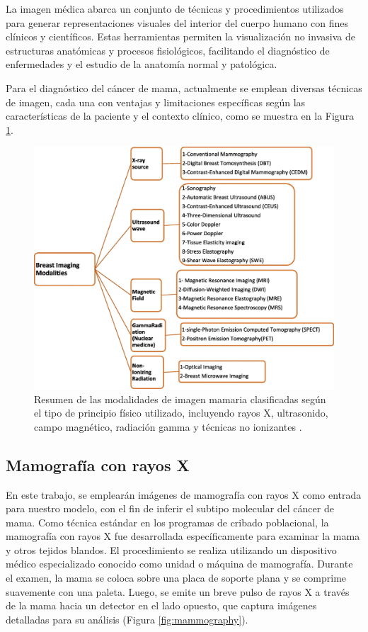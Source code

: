 \documentclass[a4paper,10pt]{book}
\begin{document}
La imagen médica abarca un conjunto de técnicas y procedimientos utilizados para generar representaciones visuales del interior del cuerpo humano con fines clínicos y científicos. Estas herramientas permiten la visualización no invasiva de estructuras anatómicas y procesos fisiológicos, facilitando el diagnóstico de enfermedades y el estudio de la anatomía normal y patológica.

Para el diagnóstico del cáncer de mama, actualmente se emplean diversas técnicas de imagen, cada una con ventajas y limitaciones específicas según las características de la paciente y el contexto clínico, como se muestra en la Figura \ref{fig:breast_cancer_medical}.

\begin{figure}[h!]
    \centering
    \includegraphics[width=0.75\linewidth]{reports//assets/medical_imaging.png}
    \caption[Resumen de modalidades de imagen mamaria]{Resumen de las modalidades de imagen mamaria clasificadas según el tipo de principio físico utilizado, incluyendo rayos X, ultrasonido, campo magnético, radiación gamma y técnicas no ionizantes \cite{iranmakani_review_2020}.}
    \label{fig:breast_cancer_medical}
\end{figure}

\subsection{Mamografía con rayos X}

En este trabajo, se emplearán imágenes de mamografía con rayos X como entrada para nuestro modelo, con el fin de inferir el subtipo molecular del cáncer de mama. Como técnica estándar en los programas de cribado poblacional, la mamografía con rayos X fue desarrollada específicamente para examinar la mama y otros tejidos blandos. El procedimiento se realiza utilizando un dispositivo médico especializado conocido como unidad o máquina de mamografía. Durante el examen, la mama se coloca sobre una placa de soporte plana y se comprime suavemente con una paleta. Luego, se emite un breve pulso de rayos X a través de la mama hacia un detector en el lado opuesto, que captura imágenes detalladas para su análisis (Figura \ref{fig:mammography}).
\end{document}
